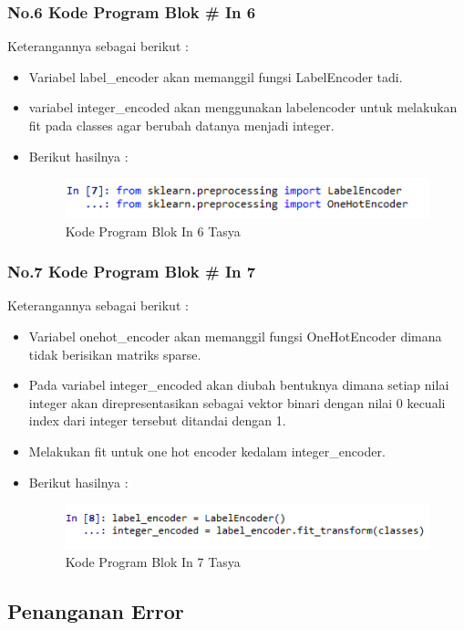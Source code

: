 \subsubsection{No.6 Kode Program Blok \# In 6}

Keterangannya sebagai berikut :\\
\begin{itemize}
\item Variabel label\_encoder akan memanggil fungsi LabelEncoder tadi.
\item variabel integer\_encoded akan menggunakan labelencoder untuk melakukan fit pada classes agar berubah datanya menjadi integer.
\item Berikut hasilnya :
\begin{figure}[ht]
\centering
\includegraphics[scale=0.5]{figures/Chapter 7/1164086/Praktek/chapter7tasya19.png}
\caption{Kode Program Blok In 6 Tasya}
\label{Praktek}
\end{figure}
\end{itemize}

\subsubsection{No.7 Kode Program Blok \# In 7}

Keterangannya sebagai berikut :\\
\begin{itemize}
\item Variabel onehot\_encoder akan memanggil fungsi OneHotEncoder dimana tidak berisikan matriks sparse.
\item Pada variabel integer\_encoded akan diubah bentuknya dimana setiap nilai integer akan direpresentasikan sebagai vektor binari dengan nilai 0 kecuali index dari integer tersebut ditandai dengan 1.
\item Melakukan fit untuk one hot encoder kedalam integer\_encoder.
\item Berikut hasilnya :\\
\begin{figure}[ht]
\centering
\includegraphics[scale=0.5]{figures/Chapter 7/1164086/Praktek/chapter7tasya20.png}
\caption{Kode Program Blok In 7 Tasya}
\label{Praktek}
\end{figure}
\end{itemize}


\subsection{Penanganan Error}
